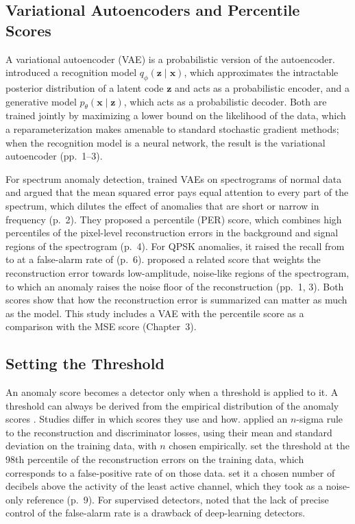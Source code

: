 \subsection{Variational Autoencoders and Percentile Scores}
\label{sec:ae-vae}

A variational autoencoder (VAE) is a probabilistic version of the autoencoder. \Textcite{kingma2014} introduced a recognition model $q_{\phi}(\mathbf{z} \mid \mathbf{x})$, which approximates the intractable posterior distribution of a latent code $\mathbf{z}$ and acts as a probabilistic encoder, and a generative model $p_{\theta}(\mathbf{x} \mid \mathbf{z})$, which acts as a probabilistic decoder. Both are trained jointly by maximizing a lower bound on the likelihood of the data, which a reparameterization makes amenable to standard stochastic gradient methods; when the recognition model is a neural network, the result is the variational autoencoder (pp.~1--3).

For spectrum anomaly detection, \textcite{tian2022} trained VAEs on spectrograms of normal data and argued that the mean squared error pays equal attention to every part of the spectrum, which dilutes the effect of anomalies that are short or narrow in frequency (p.~2). They proposed a percentile (PER) score, which combines high percentiles of the pixel-level reconstruction errors in the background and signal regions of the spectrogram (p.~4). For QPSK anomalies, it raised the recall from  to  at a false-alarm rate of  (p.~6). \Textcite{xu2021} proposed a related score that weights the reconstruction error towards low-amplitude, noise-like regions of the spectrogram, to which an anomaly raises the noise floor of the reconstruction (pp.~1, 3). Both scores show that how the reconstruction error is summarized can matter as much as the model. This study includes a VAE with the percentile score as a comparison with the MSE score (Chapter~3).

\subsection{Setting the Threshold}
\label{sec:ae-threshold}

An anomaly score becomes a detector only when a threshold is applied to it. A threshold can always be derived from the empirical distribution of the anomaly scores \parencite{ruff2021}. Studies differ in which scores they use and how. \Textcite{rajendran2019} applied an $n$-sigma rule to the reconstruction and discriminator losses, using their mean and standard deviation on the training data, with $n$ chosen empirically. \Textcite{baset2023} set the threshold at the 98th percentile of the reconstruction errors on the training data, which corresponds to a false-positive rate of  on those data. \Textcite{torio2025} set it a chosen number of decibels above the activity of the least active channel, which they took as a noise-only reference (p.~9). For supervised detectors, \textcite{gao2019} noted that the lack of precise control of the false-alarm rate is a drawback of deep-learning detectors.

